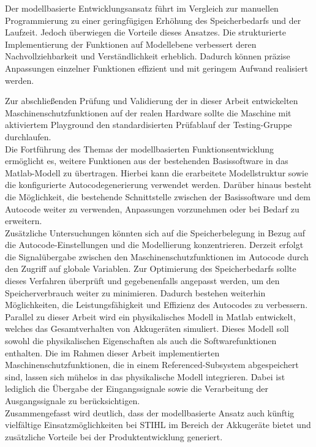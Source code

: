 Der modellbasierte Entwicklungsansatz führt im Vergleich zur manuellen Programmierung zu einer geringfügigen Erhöhung des Speicherbedarfs und der Laufzeit. Jedoch überwiegen die Vorteile dieses Ansatzes. Die strukturierte Implementierung der Funktionen auf Modellebene verbessert deren Nachvollziehbarkeit und Verständlichkeit erheblich. Dadurch können präzise Anpassungen einzelner Funktionen effizient und mit geringem Aufwand realisiert werden.

Zur abschließenden Prüfung und Validierung der in dieser Arbeit entwickelten Maschinenschutzfunktionen auf der realen Hardware sollte die Maschine mit aktiviertem Playground den standardisierten Prüfablauf der Testing-Gruppe durchlaufen.\\ 
Die Fortführung des Themas der modellbasierten Funktionsentwicklung ermöglicht es, weitere Funktionen aus der bestehenden Basissoftware in das Matlab-Modell zu übertragen. Hierbei kann die erarbeitete Modellstruktur sowie die konfigurierte Autocodegenerierung verwendet werden. Darüber hinaus besteht die Möglichkeit, die bestehende Schnittstelle zwischen der Basissoftware und dem Autocode weiter zu verwenden, Anpassungen vorzunehmen oder bei Bedarf zu erweitern.\\
Zusätzliche Untersuchungen könnten sich auf die Speicherbelegung in Bezug auf die Autocode-Einstellungen und die Modellierung konzentrieren. Derzeit erfolgt die Signalübergabe zwischen den Maschinenschutzfunktionen im Autocode durch den Zugriff auf globale Variablen. 
Zur Optimierung des Speicherbedarfs sollte dieses Verfahren überprüft und gegebenenfalls angepasst werden, um den Speicherverbrauch weiter zu minimieren. Dadurch bestehen weiterhin Möglichkeiten, die Leistungsfähigkeit und Effizienz des Autocodes zu verbessern.\\
Parallel zu dieser Arbeit wird ein physikalisches Modell in Matlab entwickelt, welches das Gesamtverhalten von Akkugeräten simuliert. Dieses Modell soll sowohl die physikalischen Eigenschaften als auch die Softwarefunktionen enthalten. Die im Rahmen dieser Arbeit implementierten Maschinenschutzfunktionen, die in einem Referenced-Subsystem abgespeichert sind, lassen sich mühelos in das physikalische Modell integrieren. Dabei ist lediglich die Übergabe der Eingangssignale sowie die Verarbeitung der Ausgangssignale zu berücksichtigen.\\
Zusammengefasst wird deutlich, dass der modellbasierte Ansatz auch künftig vielfältige Einsatzmöglichkeiten bei STIHL im Bereich der Akkugeräte bietet und zusätzliche Vorteile bei der Produktentwicklung generiert.

